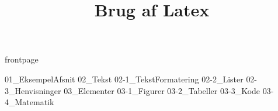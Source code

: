\documentclass[a4paper]{article}								%
\title{Brug af Latex}
\begin{document}

	{frontpage}

	\tableofcontents\thispagestyle{fancy} \newpage
	
	{01_EksempelAfsnit} \newpage
	{02_Tekst} 
		{02-1_TekstFormatering}
		{02-2_Lister}
		{02-3_Henvisninger} \newpage
	{03_Elementer}
		{03-1_Figurer}
		{03-2_Tabeller}
		{03-3_Kode}
		{03-4_Matematik} \newpage


\end{document}
